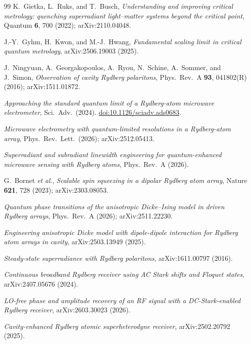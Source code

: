 \documentclass[11pt,a4paper]{article}
\begin{document}
\begin{thebibliography}{99}
 K.~Gietka, L.~Ruks, and T.~Busch,
  \emph{Understanding and improving critical metrology: quenching superradiant light--matter
  systems beyond the critical point}, Quantum \textbf{6}, 700 (2022); arXiv:2110.04048.

 J.-Y.~Gyhm, H.~Kwon, and M.-J.~Hwang,
  \emph{Fundamental scaling limit in critical quantum metrology}, arXiv:2506.19003 (2025).

 J.~Ningyuan, A.~Georgakopoulos, A.~Ryou, N.~Schine, A.~Sommer, and
  J.~Simon, \emph{Observation of cavity Rydberg polaritons},
  Phys.~Rev.~A \textbf{93}, 041802(R) (2016); arXiv:1511.01872.

 \emph{Approaching the standard quantum limit of a Rydberg-atom microwave
  electrometer}, Sci.~Adv.\ (2024).
  \href{https://doi.org/10.1126/sciadv.ads0683}{doi:10.1126/sciadv.ads0683}.

 \emph{Microwave electrometry with quantum-limited resolutions in a
  Rydberg-atom array}, Phys.~Rev.~Lett.\ (2026); arXiv:2512.05413.

 \emph{Superradiant and subradiant linewidth engineering for
  quantum-enhanced microwave sensing with Rydberg atoms}, Phys.~Rev.~A (2026).

 G.~Bornet \emph{et al.},
  \emph{Scalable spin squeezing in a dipolar Rydberg atom array},
  Nature \textbf{621}, 728 (2023); arXiv:2303.08053.

 \emph{Quantum phase transitions of the anisotropic Dicke--Ising model
  in driven Rydberg arrays}, Phys.~Rev.~A (2026); arXiv:2511.22230.

 \emph{Engineering anisotropic Dicke model with dipole-dipole
  interaction for Rydberg atom arrays in cavity}, arXiv:2503.13949 (2025).

 \emph{Steady-state superradiance with Rydberg polaritons},
  arXiv:1611.00797 (2016).

 \emph{Continuous broadband Rydberg receiver using AC Stark shifts and
  Floquet states}, arXiv:2407.05676 (2024).

 \emph{LO-free phase and amplitude recovery of an RF signal with a
  DC-Stark-enabled Rydberg receiver}, arXiv:2603.30023 (2026).

 \emph{Cavity-enhanced Rydberg atomic superheterodyne receiver},
  arXiv:2502.20792 (2025).


\end{thebibliography}
\end{document}
